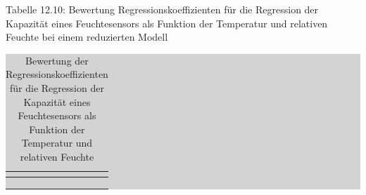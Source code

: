\noindent Tabelle 12.10: Bewertung Regressionskoeffizienten f\"{u}r die Regression der Kapazit\"{a}t eines Feuchtesensors als Funktion der Temperatur und relativen Feuchte bei einem reduzierten Modell
\begin{table}[H]
\setlength{\arrayrulewidth}{.1em}
\caption{Bewertung der Regressionskoeffizienten für die Regression der Kapazit\"{a}t eines Feuchtesensors als Funktion der Temperatur und relativen Feuchte}
\setlength{\fboxsep}{0pt}%
\colorbox{lightgray}{%
%
\begin{tabular}{| c | c | c | c | c |}
\hline
\parbox[c][0.7in][c]{1.18in}{\smallskip\centering\textbf{\selectfont{Name}}} & 
\parbox[c][0.7in][c]{1.18in}{\smallskip\centering\textbf{\selectfont{physikalische \\
Größe}}} & 
\parbox[c][0.7in][c]{1.18in}{\smallskip\centering\textbf{}} & 
\parbox[c][0.7in][c]{1.18in}{\smallskip\centering\textbf{}} & 
\parbox[c][0.7in][c]{1.18in}{\smallskip\centering\textbf{\selectfont{p-Wert}}} \\ \hline

\parbox[c][0.3in][c]{1.18in}{} &
\parbox[c][0.3in][c]{1.18in}{} &
\parbox[c][0.3in][c]{1.18in}{} &
\parbox[c][0.3in][c]{1.18in}{} &
\parbox[c][0.3in][c]{1.18in}{} \\ \hline

\parbox[c][0.3in][c]{1.18in}{} &
\parbox[c][0.3in][c]{1.18in}{} &
\parbox[c][0.3in][c]{1.18in}{} &
\parbox[c][0.3in][c]{1.18in}{} &
\parbox[c][0.3in][c]{1.18in}{} \\ \hline

\parbox[c][0.3in][c]{1.18in}{} &
\parbox[c][0.3in][c]{1.18in}{} &
\parbox[c][0.3in][c]{1.18in}{} &
\parbox[c][0.3in][c]{1.18in}{} &
\parbox[c][0.3in][c]{1.18in}{} \\ \hline

\end{tabular}%
}
\label{tab:thirteenten}
\end{table}

